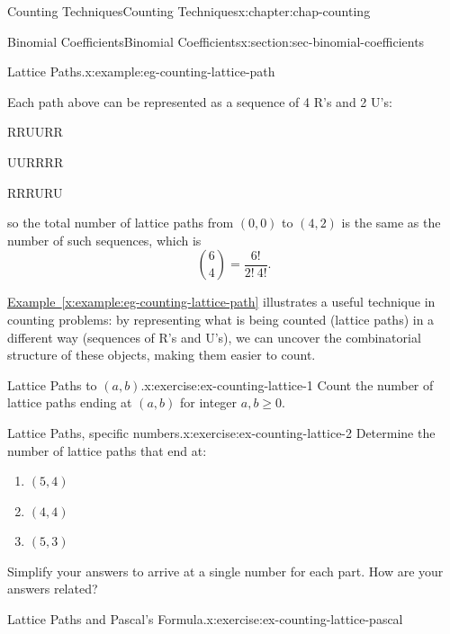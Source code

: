 \documentclass[oneside,10pt,]{book}
\newcommand{\xreffont}{\relax}
\numberwithin{equation}{section}
\begin{document}
\begin{chapterptx}{Counting Techniques}{}{Counting Techniques}{}{}{x:chapter:chap-counting}
\begin{sectionptx}{Binomial Coefficients}{}{Binomial Coefficients}{}{}{x:section:sec-binomial-coefficients}
\begin{example}{Lattice Paths.}{x:example:eg-counting-lattice-path}
\begin{sidebyside}{3}{0.0166666666666667}{0.0166666666666667}{0.0333333333333333}
\begin{sbspanel}{0.3}
{}%
\end{sbspanel}%
\end{sidebyside}%
\par
Each path above can be represented as a sequence of 4 R's and 2 U's:%
\begin{sidebyside}{3}{0.0916666666666667}{0.0916666666666667}{0.183333333333333}%
\begin{sbspanel}{0.15}%
RRUURR%
\end{sbspanel}%
\begin{sbspanel}{0.15}%
\par
UURRRR%
\end{sbspanel}%
\begin{sbspanel}{0.15}%
\par
RRRURU%
\end{sbspanel}%
\end{sidebyside}%
\par
so the total number of lattice paths from \((0,0)\) to \((4,2)\) is the same as the number of such sequences, which is%
\begin{equation*}
\binom{6}{4} = \frac{6!}{2! \ 4!}\text{.}
\end{equation*}
%
\end{example}
\hyperref[x:example:eg-counting-lattice-path]{Example~{\xreffont\ref{x:example:eg-counting-lattice-path}}} illustrates a useful technique in counting problems: by representing what is being counted (lattice paths) in a different way (sequences of R's and U's), we can uncover the combinatorial structure of these objects, making them easier to count.%
\begin{inlineexercise}{Lattice Paths to \((a,b)\).}{x:exercise:ex-counting-lattice-1}%
Count the number of lattice paths ending at \((a,b)\) for integer \(a,b \geq 0\).%
\end{inlineexercise}
\begin{inlineexercise}{Lattice Paths, specific numbers.}{x:exercise:ex-counting-lattice-2}%
Determine the number of lattice paths that end at:%
\begin{enumerate}[label=(\alph*)]
\item{}\(\displaystyle (5,4)\)%
\item{}\(\displaystyle (4,4)\)%
\item{}\(\displaystyle (5,3)\)%
\end{enumerate}
Simplify your answers to arrive at a single number for each part. How are your answers related?%
\end{inlineexercise}
\begin{inlineexercise}{Lattice Paths and Pascal's Formula.}{x:exercise:ex-counting-lattice-pascal}%

\end{inlineexercise}
\end{sectionptx}
\end{chapterptx}
\end{document}
